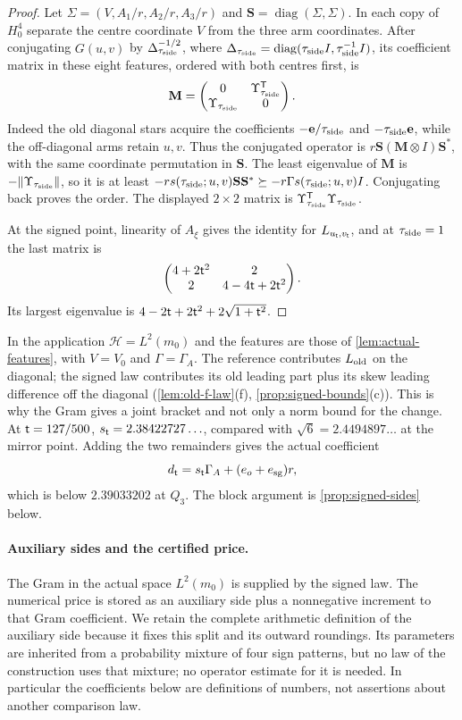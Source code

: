 \begin{proof}
Let $\Sigma=(V,A_1/r,A_2/r,A_3/r)$ and
$\mathbf S=\operatorname{diag}(\Sigma,\Sigma)$. In each copy of $H_0^4$
separate the centre coordinate $V$ from the three arm coordinates. After
conjugating $G(u,v)$ by
$\Delta_{\tau_{\mathrm{side}}}^{-1/2}$, where
$\Delta_{\tau_{\mathrm{side}}}=\operatorname{diag}(\tau_{\mathrm{side}} I,\tau_{\mathrm{side}}^{-1}I)$, its coefficient
matrix in these eight features, ordered with both centres first, is
\[
 \mathbf M=\begin{pmatrix}0&\Upsilon_{\tau_{\mathrm{side}}}^{\mathsf T}\\
 \Upsilon_{\tau_{\mathrm{side}}}&0\end{pmatrix}.
\]
Indeed the old diagonal stars acquire the coefficients
$-\mathbf e/\tau_{\mathrm{side}}$ and $-\tau_{\mathrm{side}}\mathbf e$, while the off-diagonal arms retain
$u,v$. Thus the conjugated operator is
$r\mathbf S(\mathbf M\otimes I)\mathbf S^*$, with the same coordinate
permutation in $\mathbf S$. The least eigenvalue of $\mathbf M$ is
$-\|\Upsilon_{\tau_{\mathrm{side}}}\|$, so it is at least
$-r s(\tau_{\mathrm{side}};u,v)\mathbf S\mathbf S^*\succeq-r\Gamma s(\tau_{\mathrm{side}};u,v)I$.
Conjugating back proves the order. The displayed $2\times2$ matrix is
$\Upsilon_{\tau_{\mathrm{side}}}^{\mathsf T}\Upsilon_{\tau_{\mathrm{side}}}$.

At the signed point, linearity of $A_\xi$ gives the identity for
$L_{u_\mathsf t,v_\mathsf t}$, and at $\tau_{\mathrm{side}}=1$ the last matrix is
\[
 \begin{pmatrix}4+2\mathsf t^2&2\\2&4-4\mathsf t+2\mathsf t^2\end{pmatrix}.
\]
Its largest eigenvalue is $4-2\mathsf t+2\mathsf t^2+2\sqrt{1+\mathsf t^2}$.
\end{proof}

In the application $\mathcal H=L^2(m_0)$ and the features are those of
\cref{lem:actual-features}, with $V=V_0$ and $\Gamma=\Gamma_A$.
The reference contributes $L_{\rm old}$ on the diagonal; the signed law
contributes its old leading part plus its skew leading difference off the
diagonal (\cref{lem:old-f-law}(f), \cref{prop:signed-bounds}(c)). This is why the
Gram gives a joint bracket and not only a norm bound for the change. At
$\mathsf t=127/500$, $s_\mathsf t=2.38422727\ldots$, compared with $\sqrt6=2.4494897\ldots$
at the mirror point. Adding the two remainders gives the actual coefficient
\[
 d_\mathsf t=s_\mathsf t\Gamma_A+(e_o+e_{\rm sg})r,
\]
which is below $2.39033202$ at $Q_3$. The block argument is
\cref{prop:signed-sides} below.

\paragraph{Auxiliary sides and the certified price.}
The Gram in the actual space $L^2(m_0)$ is supplied by the signed law. The numerical price is stored
as an auxiliary side plus a nonnegative increment to that Gram coefficient.
We retain the complete arithmetic definition of the auxiliary side because it
fixes this split and its outward roundings. Its parameters are inherited from
a probability mixture of four sign patterns, but no law of the construction
uses that mixture; no operator estimate for it is needed. In particular the
coefficients below are definitions of numbers, not assertions about another
comparison law.

